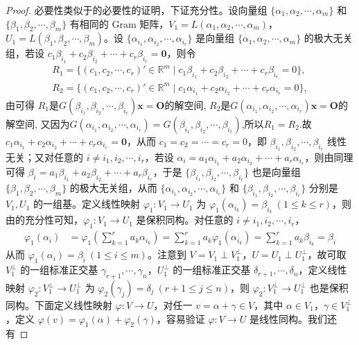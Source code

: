 \documentclass[../../main.tex]{subfiles}
\begin{document}
\begin{proof}
必要性类似于的必要性的证明，下证充分性。设向量组 \(\{\alpha_1,\alpha_2,\cdots,\alpha_m\}\) 和 \(\{\beta_1,\beta_2,\cdots,\beta_m\}\) 有相同的 Gram 矩阵，\(V_1 = L(\alpha_1,\alpha_2,\cdots,\alpha_m)\)，\(U_1 = L(\beta_1,\beta_2,\cdots,\beta_m)\)。设 \(\{\alpha_{i_1},\alpha_{i_2},\cdots,\alpha_{i_r}\}\) 是向量组 \(\{\alpha_1,\alpha_2,\cdots,\alpha_m\}\) 的极大无关组，若设 \(c_1\beta_{i_1} + c_2\beta_{i_2} + \cdots + c_r\beta_{i_r} = \mathbf{0}\)，则令
\begin{align*}
R_1=\{(c_1,c_2,\cdots ,c_r)' \in \mathbb{R} ^m\mid c_1\beta _{i_1}+c_2\beta _{i_2}+\cdots +c_r\beta _{i_r}=0\},
\\
R_2=\{(c_1,c_2,\cdots ,c_r)' \in \mathbb{R} ^m\mid c_1\alpha _{i_1}+c_2\alpha _{i_2}+\cdots +c_r\alpha _{i_r}=0\},
\end{align*}
由可得 $R_1$是$G\left( \beta _{i_1},\beta _{i_2},\cdots ,\beta _{i_r} \right) \boldsymbol{x}=\boldsymbol{O}$的解空间,
$R_2$是$G\left( \alpha _{i_1},\alpha _{i_2},\cdots ,\alpha _{i_r} \right) \boldsymbol{x}=\boldsymbol{O}$的解空间,
又因为$G\left( \alpha _{i_1},\alpha _{i_2},\cdots ,\alpha _{i_r} \right) =G\left( \beta _{i_1},\beta _{i_2},\cdots ,\beta _{i_r} \right)$,所以$R_1=R_2$.故\(c_1\alpha_{i_1} + c_2\alpha_{i_2} + \cdots + c_r\alpha_{i_r} = \mathbf{0}\)，从而 \(c_1 = c_2 = \cdots = c_r = 0\)，即 \(\beta_{i_1},\beta_{i_2},\cdots,\beta_{i_r}\) 线性无关；又对任意的 \(i \neq i_1,i_2,\cdots,i_r\)，若设 \(\alpha_i = a_1\alpha_{i_1} + a_2\alpha_{i_2} + \cdots + a_r\alpha_{i_r}\)，则由同理可得 \(\beta_i = a_1\beta_{i_1} + a_2\beta_{i_2} + \cdots + a_r\beta_{i_r}\)，于是 \(\{\beta_{i_1},\beta_{i_2},\cdots,\beta_{i_r}\}\) 也是向量组 \(\{\beta_1,\beta_2,\cdots,\beta_m\}\) 的极大无关组，从而 \(\{\alpha_{i_1},\alpha_{i_2},\cdots,\alpha_{i_r}\}\) 和 \(\{\beta_{i_1},\beta_{i_2},\cdots,\beta_{i_r}\}\) 分别是 \(V_1,U_1\) 的一组基。定义线性映射 \(\varphi_1:V_1 \to U_1\) 为 \(\varphi_1(\alpha_{i_k}) = \beta_{i_k}\ (1\leq k \leq r)\)，则由的充分性可知，\(\varphi_1:V_1 \to U_1\) 是保积同构。对任意的 \(i \neq i_1,i_2,\cdots,i_r\)，
\begin{align*}
\varphi_1(\alpha_i) &= \varphi_1\left(\sum_{k = 1}^{r}a_k\alpha_{i_k}\right) = \sum_{k = 1}^{r}a_k\varphi_1(\alpha_{i_k}) = \sum_{k = 1}^{r}a_k\beta_{i_k} = \beta_i
\end{align*}
从而 \(\varphi_1(\alpha_i) = \beta_i\ (1\leq i \leq m)\)。注意到 \(V = V_1 \perp V_1^{\perp}\)，\(U = U_1 \perp U_1^{\perp}\)，故可取 \(V_1^{\perp}\) 的一组标准正交基 \(\gamma_{r + 1},\cdots,\gamma_n\)，\(U_1^{\perp}\) 的一组标准正交基 \(\delta_{r + 1},\cdots,\delta_n\)，定义线性映射 \(\varphi_2:V_1^{\perp} \to U_1^{\perp}\) 为 \(\varphi_2(\gamma_j) = \delta_j\ (r + 1\leq j \leq n)\)，则 \(\varphi_2:V_1^{\perp} \to U_1^{\perp}\) 也是保积同构。下面定义线性映射 \(\varphi:V \to U\)，对任一 \(v = \alpha + \gamma \in V\)，其中 \(\alpha \in V_1\)，\(\gamma \in V_1^{\perp}\)，定义 \(\varphi(v) = \varphi_1(\alpha) + \varphi_2(\gamma)\)，容易验证 \(\varphi:V \to U\) 是线性同构。我们还有

\end{proof}
\end{document}
